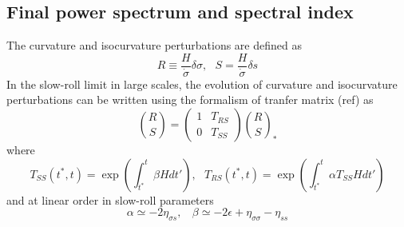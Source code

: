 \documentclass[a4paper,fleqn,usenatbib,useAMS]{mnras}
\begin{document}
\subsection{Final power spectrum and spectral index}
The curvature and isocurvature perturbations are defined as
\begin{equation}\label{RS}
R\equiv\frac{H}{\dot\sigma}\delta \sigma, \ \ \ S=\frac{H}{\dot \sigma}\delta s
\end{equation}
In the slow-roll limit in large scales, the evolution of curvature and isocurvature perturbations can be written using the formalism of tranfer matrix (ref) as
\begin{equation}
\binom{R }{S}=\begin{pmatrix}1 & T_{RS}\\ 0& T_{SS}\end{pmatrix}\binom{R}{S}_*
\end{equation}
where
\begin{subequations}
\begin{equation}
T_{SS}(t^*,t)=\exp\left(\int^t_{t^*}\beta Hdt'\right), \ \ \
\end{equation}
\begin{equation}\label{TRS}
T_{RS}(t^*,t)=\exp\left(\int^t_{t^*}\alpha T_{SS}Hdt'\right)
\end{equation}
\end{subequations}
and at linear order in slow-roll parameters
\begin{equation}
\alpha\simeq -2\eta_{\sigma s}, \ \ \ \ \beta\simeq-2\epsilon+\eta_{\sigma\sigma}-\eta_{ss}
\end{equation}
\end{document}
